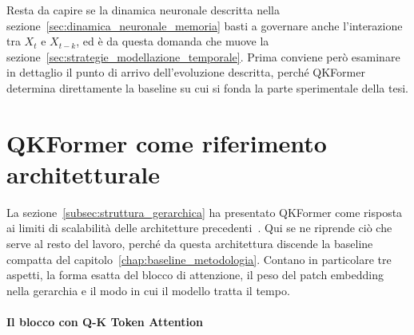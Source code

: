 Resta da capire se la dinamica neuronale descritta nella sezione~\ref{sec:dinamica_neuronale_memoria} basti a governare anche l'interazione tra $X_t$ e $X_{t-k}$, ed è da questa domanda che muove la sezione~\ref{sec:strategie_modellazione_temporale}. Prima conviene però esaminare in dettaglio il punto di arrivo dell'evoluzione descritta, perché QKFormer determina direttamente la baseline su cui si fonda la parte sperimentale della tesi.




\section{QKFormer come riferimento architetturale}
\label{sec:qkformer_riferimento}

La sezione~\ref{subsec:struttura_gerarchica} ha presentato QKFormer come risposta ai limiti di scalabilità delle architetture precedenti~\cite{zhou2024qkformer}. Qui se ne riprende ciò che serve al resto del lavoro, perché da questa architettura discende la baseline compatta del capitolo~\ref{chap:baseline_metodologia}. Contano in particolare tre aspetti, la forma esatta del blocco di attenzione, il peso del patch embedding nella gerarchia e il modo in cui il modello tratta il tempo.

\paragraph{Il blocco con Q-K Token Attention}
\label{subsec:qk_attention}

